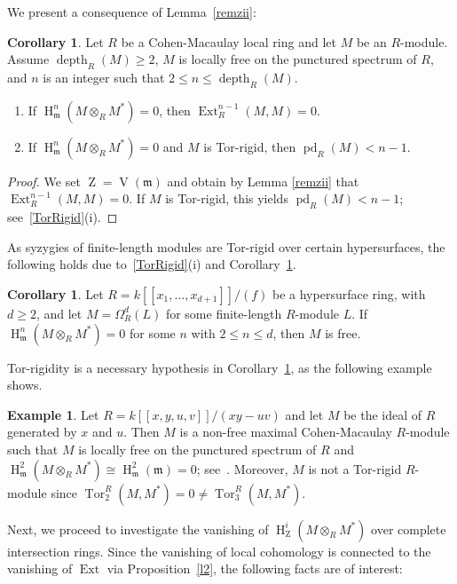 \documentclass[11pt]{amsart}
\theoremstyle{definition}
\newtheorem{cor}[thm]{Corollary}
\theoremstyle{definition}
\newtheorem{eg}[thm]{Example}
\numberwithin{equation}{section}
\newcommand{\fm}{\mathfrak{m}}
\DeclareMathOperator{\V}{V}
\DeclareMathOperator{\mz}{Z}
\DeclareMathOperator{\depth}{depth}
\DeclareMathOperator{\Ext}{Ext}
\DeclareMathOperator{\hh}{H}
\DeclareMathOperator{\pd}{pd}
\DeclareMathOperator{\Tor}{Tor}
\begin{document}
We present a consequence of Lemma~\ref{remzii}:

\begin{cor} \label{remzidenoturu} Let $R$ be a Cohen-Macaulay local ring and let $M$ be an $R$-module. Assume $\depth_R(M)\geq 2$, $M$ is locally free on the punctured spectrum of $R$, and $n$ is an integer such that $2\leq n\leq\depth_R(M)$.
\begin{enumerate}[\rm(i)]
\item If $\hh^n_{\fm}(M\otimes_RM^{\ast})=0$, then $\Ext^{n-1}_R(M,M)=0$.
\item If $\hh^n_{\fm}(M\otimes_RM^{\ast})=0$ and $M$ is Tor-rigid, then $\pd_R(M)<n-1$. 
\end{enumerate}
\end{cor}

\begin{proof} We set $\mz=\V(\fm)$ and obtain by Lemma \ref{remzii} that $\Ext^{n-1}_R(M,M)=0$. If $M$ is Tor-rigid, this yields $\pd_R(M)<n-1$; see~\ref{TorRigid}(i).
\end{proof}

As syzygies of finite-length modules are Tor-rigid over certain hypersurfaces, the following holds due to~\ref{TorRigid}(i) and Corollary~\ref{remzidenoturu}.

\begin{cor} Let $R=k[\![x_1, \ldots, x_{d+1}]\!]/(f)$ be a hypersurface ring, with $d\geq 2$, and let $M=\Omega_R^d(L)$ for some finite-length $R$-module $L$. If $\hh^n_{\fm}(M\otimes_RM^{\ast})=0$ for some $n$ with $2\leq n \leq d$, then $M$ is free. 
\end{cor}

Tor-rigidity is a necessary hypothesis in Corollary~\ref{remzidenoturu}, as the following example shows.

\begin{eg} \label{TRE} Let $R=k[\![x,y,u,v]\!]/(xy-uv)$ and let $M$ be the ideal of $R$ generated by $x$ and $u$. Then $M$ is a non-free maximal Cohen-Macaulay $R$-module such that $M$ is locally free on the punctured spectrum of $R$ and $\hh_{\fm}^2(M\otimes_RM^{\ast}) \cong \hh_{\fm}^2(\fm)=0$; see~\cite[1.8]{HW2}. Moreover, $M$ is not a Tor-rigid $R$-module since $\Tor^R_2(M,M^{\ast})=0\neq \Tor^R_3(M,M^{\ast})$.
\end{eg}

Next, we proceed to investigate the vanishing of $\hh^i_{\mz}(M\otimes_RM^*)$ over complete intersection rings. Since the vanishing of local cohomology is connected to the vanishing of $\Ext$ via Proposition~\ref{l2}, the following facts are of interest:
\end{document}
